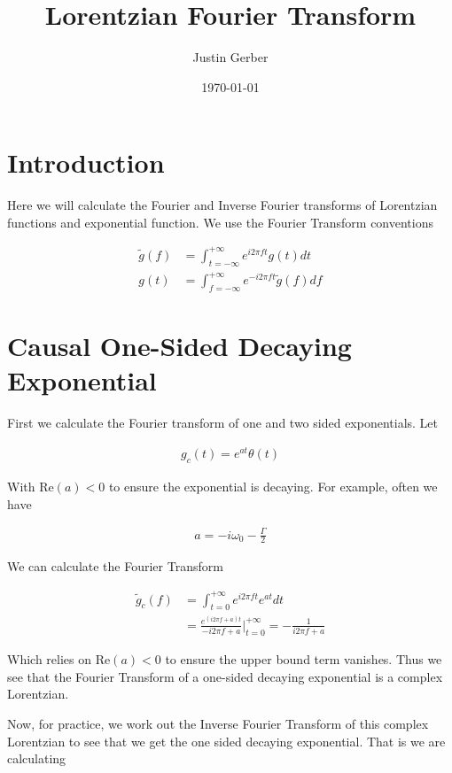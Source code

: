 \documentclass[12pt]{article}
\begin{document}
\title{Lorentzian Fourier Transform}
\author{Justin Gerber}
\date{\today}
\maketitle

\section{Introduction}

Here we will calculate the Fourier and Inverse Fourier transforms of Lorentzian functions and exponential function. We use the Fourier Transform conventions

\begin{align}
\tilde{g}(f) &= \int_{t=-\infty}^{+\infty} e^{i 2 \pi f t} g(t) dt\\
g(t) &= \int_{f = -\infty}^{+\infty} e^{-i 2 \pi f t} \tilde{g}(f) df
\end{align}

\section{Causal One-Sided Decaying Exponential}
First we calculate the Fourier transform of one and two sided exponentials. Let

\begin{align}
g_c(t) = e^{a t} \theta(t)
\end{align}

With $\text{Re}(a) <0$ to ensure the exponential is decaying. For example, often we have

\begin{align}
a = -i\omega_0 - \frac{\Gamma}{2}
\end{align}

We can calculate the Fourier Transform

\begin{align}
\tilde{g}_c(f) &= \int_{t=0}^{+\infty} e^{i2 \pi f t} e^{a t} dt\\
&= \frac{e^{(i 2 \pi f + a)t}}{-i 2 \pi f + a}\Bigg\rvert_{t=0}^{+\infty} = -\frac{1}{i 2 \pi f + a}
\end{align}

Which relies on $\text{Re}(a)<0$ to ensure the upper bound term vanishes. Thus we see that the Fourier Transform of a one-sided decaying exponential is a complex Lorentzian.

Now, for practice, we work out the Inverse Fourier Transform of this complex Lorentzian to see that we get the one sided decaying exponential. That is we are calculating
\end{document}
